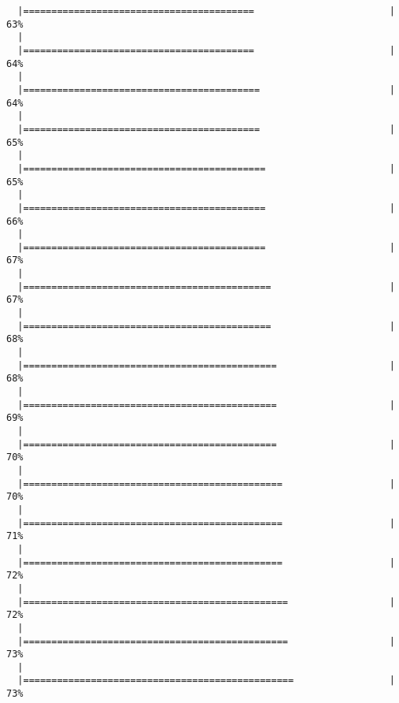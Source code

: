 \documentclass[]{article}
\begin{document}
\begin{verbatim}
  |=========================================                        |  63%
  |                                                                       
  |=========================================                        |  64%
  |                                                                       
  |==========================================                       |  64%
  |                                                                       
  |==========================================                       |  65%
  |                                                                       
  |===========================================                      |  65%
  |                                                                       
  |===========================================                      |  66%
  |                                                                       
  |===========================================                      |  67%
  |                                                                       
  |============================================                     |  67%
  |                                                                       
  |============================================                     |  68%
  |                                                                       
  |=============================================                    |  68%
  |                                                                       
  |=============================================                    |  69%
  |                                                                       
  |=============================================                    |  70%
  |                                                                       
  |==============================================                   |  70%
  |                                                                       
  |==============================================                   |  71%
  |                                                                       
  |==============================================                   |  72%
  |                                                                       
  |===============================================                  |  72%
  |                                                                       
  |===============================================                  |  73%
  |                                                                       
  |================================================                 |  73%

\end{verbatim}
\end{document}
